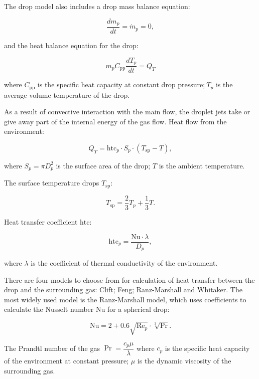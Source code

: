 \documentclass[aerospace,article,submit,moreauthors,pdftex]{Definitions/mdpi}
\begin{document}
The drop model also includes a drop mass balance equation:

\begin{equation}
    \frac{d m_{p}}{d t} = {\dot{m}}_{p} = 0,    
\end{equation}

and the heat balance equation for the drop:

\begin{equation}
    m_{p}C_{\text{pp}}\frac{dT_{p}}{dt} = Q_{T}    
\end{equation}

where $C_{\text{pp}}$ is the specific heat capacity at constant drop pressure;$\ T_{p}$ is the average volume temperature of the drop.

As a result of convective interaction with the main flow, the droplet jets take or give away part of the internal energy of the gas flow. Heat flow from the environment:

\begin{equation}
Q_{T} = \text{htc}_p \cdot S_{p} \cdot (T_{\text{sp}} - T),    
\end{equation}

where $S_{p} = \pi D_{p}^{2}$ is the surface area of the drop; $T$ is the ambient temperature.

The surface temperature drops $T_{\text{sp}}$:

\begin{equation}
    T_{\text{sp}} = \frac{2}{3}T_{p} + \frac{1}{3}T.    
\end{equation}

Heat transfer coefficient $\text{htc}$:

\begin{equation}
    \text{htc}_p = \frac{\text{Nu} \cdot \lambda}{D_{p}},    
\end{equation}

where $\lambda$ is the coefficient of thermal conductivity of the environment.

There are four models to choose from for calculation of heat transfer between the drop and the surrounding gas: Clift; Feng; Ranz-Marshall and Whitaker. The most widely used model is the Ranz-Marshall model, which uses coefficients to calculate the Nusselt number Nu for a spherical drop:

\begin{equation}
    \text{Nu} = 2 + 0.6\sqrt{\text{Re}_{p}} \cdot \sqrt[3]{\Pr}.    
\end{equation}

The Prandtl number of the gas $\Pr = \dfrac{c_{p}\mu}{\lambda} $ where $c_{p}$ is the specific heat capacity of the environment at constant pressure; $\mu$ is the dynamic viscosity of the surrounding gas.
\end{document}
